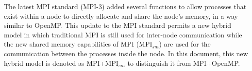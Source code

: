 \begin{comment}






Today's trend of having 
an increasing number of cores per CPU (computing component, socket,chip) have created the need for approaches that combines the best of this two programing models: 


Almost all chips are multicore these days


 into what is nowadays known as Hybrid programming models.


It describes parallelism between processes having separate memory space; 

a 


in contrast to 

\emph{thread} parallelism which provides a shared memory model within a process. 

OpenMP and Pthreads are common examples of the \emph{thread} parallelism model.




Scale of machines to come encourage the use of different programming models to address issues such as

\begin{itemize} 

\item Declining memory per core

\item Multiple threads/core

\item Load balance

\item Algorithmic issues


\end{itemize}
\end{comment}



\medskip

The latest MPI standard (MPI-3) added several functions to allow processes that exist within a node to directly allocate and share the node's memory, in a way similar to OpenMP. This update to the MPI standard permits a new hybrid model in which traditional MPI is still used for inter-node communication while the new shared memory capabilities of MPI (MPI$_{sm}$) are used for the communication between the processes inside the node. In this document, this new hybrid model is denoted as MPI+MPI$_{sm}$ to distinguish it from MPI+OpenMP.

\medskip


